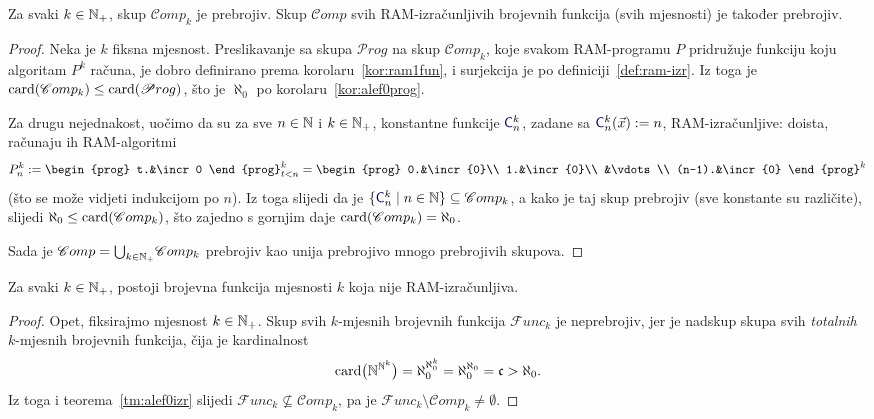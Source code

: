 \begin{teorem}[{name=[prebrojivost skupa $\mathscr Comp$]}]\label{tm:alef0izr}
Za svaki $k\in{\mathbb N}_+$, skup $\mathscr Comp_k$ je prebrojiv. Skup $\mathscr Comp$ svih RAM-izračunljivih brojevnih funkcija (svih mjesnosti) je također prebrojiv.
\end{teorem}
\begin{proof}
Neka je $k$ fiksna mjesnost. Preslikavanje
sa skupa $\mathscr Prog$ na skup $\mathscr Comp_k$,
    koje svakom RAM-programu $P$ pridružuje funkciju koju algoritam $P^k$ računa, je dobro definirano prema korolaru~\ref{kor:ram1fun}, i surjekcija je po definiciji~\ref{def:ram-izr}. Iz toga je $\operatorname{card}(\mathscr Comp_k)\le\operatorname{card}(\mathscr Prog)$, što je $\aleph_0$ po korolaru~\ref{kor:alef0prog}.

Za drugu nejednakost, uočimo da su za sve $n\in{\mathbb N}$ i $k\in{\mathbb N}_+$, konstantne funkcije $\f{C}_n^k$, zadane sa
$\f{C}_n^k(\vec x):=n$, RAM-izračunljive: doista, računaju ih RAM-algoritmi
\begin{equation}\label{eq:konstRAM}
    P_n^k:=\begin{prog}
    t.&\incr0
    \end{prog}_{t<n}^k=\begin{prog}
    0.&\incr{0}\\
    1.&\incr{0}\\
    &\vdots\\
    (n-1).&\incr{0}
    \end{prog}^k
\end{equation}
(što se može vidjeti indukcijom po $n$).
Iz toga slijedi da je $\{\f{C}_n^k\mid n\in\N\}\subseteq\mathscr Comp_k$, a kako je taj skup prebrojiv (sve konstante su različite), slijedi $\aleph_0\le\operatorname{card}(\mathscr Comp_k)$, što zajedno s gornjim daje $\operatorname{card}(\mathscr Comp_k)=\aleph_0$.

Sada je $\mathscr Comp=\bigcup_{k\in{\mathbb N}_+}\!\mathscr Comp_k$ prebrojiv kao unija prebrojivo mnogo prebrojivih skupova.
\end{proof}

\begin{korolar}[{name=[postojanje ne-RAM-izračunljivih funkcija]}]\label{kor:exneizrk}
Za svaki $k\in{\mathbb N}_+$, postoji brojevna funkcija mjesnosti $k$ koja nije RAM-izračunljiva.
\end{korolar}
\begin{proof}
Opet, fiksirajmo mjesnost $k\in{\mathbb N}_+$. Skup svih $k$-mjesnih brojevnih funkcija $\mathscr Func_k$ je neprebrojiv, jer je nadskup skupa svih \emph{totalnih} $k$-mjesnih brojevnih funkcija, čija je kardinalnost
\begin{equation}
    \operatorname{card}\bigl({\mathbb N}^{{\mathbb N}^k}\bigr)=\aleph_0^{\aleph_0^k}=\aleph_0^{\aleph_0}=\mathfrak c>\aleph_0\text.
\end{equation}
    Iz toga i teorema~\ref{tm:alef0izr} slijedi $\mathscr Func_k\nsubseteq\mathscr Comp_k$, pa je $\mathscr Func_k\setminus\mathscr Comp_k\ne\emptyset$.
\end{proof}

